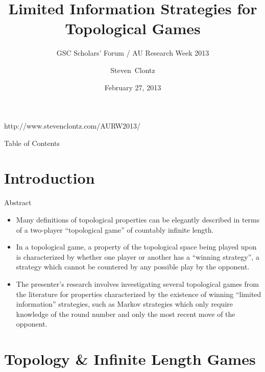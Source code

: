 \documentclass{beamer}
\title[Limited Information Strategies for Topological Games] %
{Limited Information Strategies for Topological Games}
\subtitle
{GSC Scholars' Forum / AU Research Week 2013} %
\author%
{Steven~Clontz}%
\institute[Auburn University] %
{
  Department of Mathematics and Statistics\\
  Auburn University}
\date[13-02-27] %
{February 27, 2013}
\begin{document}
\begin{frame}
  \titlepage

  {\tiny http://www.stevenclontz.com/AURW2013/}
\end{frame}

\begin{frame}{Table of Contents}
  \tableofcontents
\end{frame}




\section{Introduction}

\begin{frame}{Abstract}%

  \begin{itemize}
  \item
    Many definitions of topological properties can be elegantly described in terms of a two-player ``topological game'' of countably infinite length. 
  \pause
  \item
    In a topological game, a property of the topological space being played upon is characterized by whether one player or another has a ``winning strategy'', a strategy which cannot be countered by any possible play by the opponent. 
  \pause
  \item 
    The presenter's research involves investigating several topological games from the literature for properties characterized by the existence of winning ``limited information'' strategies, such as Markov strategies which only require knowledge of the round number and only the most recent move of the opponent. 
  \end{itemize}
\end{frame}

\section{Topology \& Infinite Length Games}
\end{document}
